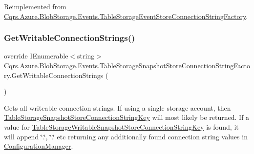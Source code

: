 Reimplemented from \hyperlink{classCqrs_1_1Azure_1_1BlobStorage_1_1Events_1_1TableStorageEventStoreConnectionStringFactory_a047e58aa30e97231dc913df350bc2446_a047e58aa30e97231dc913df350bc2446}{Cqrs.\+Azure.\+Blob\+Storage.\+Events.\+Table\+Storage\+Event\+Store\+Connection\+String\+Factory}.

\mbox{\label{classCqrs_1_1Azure_1_1BlobStorage_1_1Events_1_1TableStorageSnapshotStoreConnectionStringFactory_a78f9987855e2c4c370c624b0edb97f4d_a78f9987855e2c4c370c624b0edb97f4d}} 
\subsubsection{\texorpdfstring{Get\+Writable\+Connection\+Strings()}{GetWritableConnectionStrings()}}
{\footnotesize\ttfamily override I\+Enumerable$<$string$>$ Cqrs.\+Azure.\+Blob\+Storage.\+Events.\+Table\+Storage\+Snapshot\+Store\+Connection\+String\+Factory.\+Get\+Writable\+Connection\+Strings (\begin{DoxyParamCaption}{ }\end{DoxyParamCaption})\hspace{0.3cm}{\ttfamily [virtual]}}



Gets all writeable connection strings. If using a single storage account, then \hyperlink{classCqrs_1_1Azure_1_1BlobStorage_1_1Events_1_1TableStorageSnapshotStoreConnectionStringFactory_aeb34e21116be39f3f34e5970001f3762_aeb34e21116be39f3f34e5970001f3762}{Table\+Storage\+Snapshot\+Store\+Connection\+String\+Key} will most likely be returned. If a value for \hyperlink{classCqrs_1_1Azure_1_1BlobStorage_1_1Events_1_1TableStorageSnapshotStoreConnectionStringFactory_a7bb0a4b42242b523df90611e8c28a4e6_a7bb0a4b42242b523df90611e8c28a4e6}{Table\+Storage\+Writable\+Snapshot\+Store\+Connection\+String\+Key} is found, it will append \char`\"{}.\char`\"{}, \char`\"{}.\char`\"{} etc returning any additionally found connection string values in \hyperlink{namespaceCqrs_1_1Azure_1_1ConfigurationManager}{Configuration\+Manager}. 



